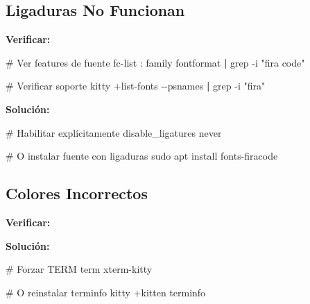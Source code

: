 \documentclass[
  doc,
  floatsintext,
  longtable,
  a4paper,
  nolmodern,
  notxfonts,
  notimes,
  12pt,
  colorlinks=true,linkcolor=blue,citecolor=blue,urlcolor=blue]{apa7}
\newenvironment{Shaded}{\begin{snugshade}}{\end{snugshade}}
\newcommand{\AttributeTok}[1]{\textcolor[rgb]{0.40,0.45,0.13}{#1}}
\newcommand{\BuiltInTok}[1]{\textcolor[rgb]{0.00,0.23,0.31}{#1}}
\newcommand{\CommentTok}[1]{\textcolor[rgb]{0.37,0.37,0.37}{#1}}
\newcommand{\DataTypeTok}[1]{\textcolor[rgb]{0.68,0.00,0.00}{#1}}
\newcommand{\ErrorTok}[1]{\textcolor[rgb]{0.68,0.00,0.00}{#1}}
\newcommand{\ExtensionTok}[1]{\textcolor[rgb]{0.00,0.23,0.31}{#1}}
\newcommand{\FunctionTok}[1]{\textcolor[rgb]{0.28,0.35,0.67}{#1}}
\newcommand{\KeywordTok}[1]{\textcolor[rgb]{0.00,0.23,0.31}{\textbf{#1}}}
\newcommand{\NormalTok}[1]{\textcolor[rgb]{0.00,0.23,0.31}{#1}}
\newcommand{\StringTok}[1]{\textcolor[rgb]{0.13,0.47,0.30}{#1}}
\newcommand{\VariableTok}[1]{\textcolor[rgb]{0.07,0.07,0.07}{#1}}
\begin{document}
\subsection{Ligaduras No Funcionan}\label{ligaduras-no-funcionan}

\textbf{Verificar:}

\begin{Shaded}
\begin{Highlighting}[]
\CommentTok{\# Ver features de fuente}
\ExtensionTok{fc{-}list}\NormalTok{ : family fontformat }\KeywordTok{|} \FunctionTok{grep} \AttributeTok{{-}i} \StringTok{"fira code"}

\CommentTok{\# Verificar soporte}
\ExtensionTok{kitty}\NormalTok{ +list{-}fonts }\AttributeTok{{-}{-}psnames} \KeywordTok{|} \FunctionTok{grep} \AttributeTok{{-}i} \StringTok{"fira"}
\end{Highlighting}
\end{Shaded}

\textbf{Solución:}

\begin{Shaded}
\begin{Highlighting}[]
\CommentTok{\# Habilitar explícitamente}
\DataTypeTok{disable\_ligatures} \DataTypeTok{never}

\CommentTok{\# O instalar fuente con ligaduras}
\DataTypeTok{sudo} \DataTypeTok{apt} \DataTypeTok{install} \DataTypeTok{fonts{-}firacode}
\end{Highlighting}
\end{Shaded}

\subsection{Colores Incorrectos}\label{colores-incorrectos}

\textbf{Verificar:}

\begin{Shaded}
\end{Shaded}

\textbf{Solución:}

\begin{Shaded}
\begin{Highlighting}[]
\CommentTok{\# Forzar TERM}
\DataTypeTok{term} \DataTypeTok{xterm{-}kitty}

\CommentTok{\# O reinstalar terminfo}
\DataTypeTok{kitty} \ErrorTok{+}\DataTypeTok{kitten} \DataTypeTok{terminfo}
\end{Highlighting}
\end{Shaded}
\end{document}
